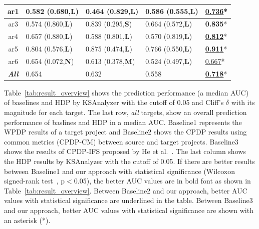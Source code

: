 \begin{table}[!t]
\begin{tabular}{|@{}c@{}||@{}C{21mm}@{}|@{}C{21mm}@{}|@{}C{21mm}@{}||@{}C{8mm}@{}|}
ar1	&0.582 (0.680,{\bf L})	&0.464 (0.829,{\bf L})	&0.586 (0.555,{\bf L})	&\underline{{\bf 0.736}}* \\ \hline
ar3	&0.574 (0.860,{\bf L})	&0.839 (0.295,{\bf S})	&0.664 (0.572,{\bf L})	&{\bf 0.835}* \\ \hline
ar4	&0.657 (0.880,{\bf L})	&0.588 (0.801,{\bf L})	&0.570 (0.819,{\bf L})	&\underline{{\bf 0.812}}* \\ \hline
ar5	&0.804 (0.576,{\bf L})	&0.875 (0.474,{\bf L})	&0.766 (0.550,{\bf L})	&\underline{{\bf 0.911}}* \\ \hline
ar6	&0.654 (0.072,{\bf N})	&0.613 (0.378,{\bf M})	&0.524 (0.497,{\bf L})	&\underline{0.667}* \\ \hline
\hline
{\bf {\em All}}	&0.654		&0.632		&0.558		&\underline{{\bf 0.718}}*
\\ \hline



\end{tabular}
\end{table}

% 


Table~\ref{tab:result_overview} shows the prediction performance (a median AUC)
of baselines and HDP by KSAnalyzer with the cutoff of 0.05 and Cliff's $\delta$ with its magnitude
for each target. The last row, {\em all} targets, show an overall prediction performance of baslines and HDP in a median AUC. Baseline1 represents
the WPDP results of a target project and Baseline2 shows
the CPDP results using common metrics (CPDP-CM) between source and target
projects. Baseline3 shows the results of CPDP-IFS proposed by He et
al.~\cite{He14}. The last column shows the HDP results by KSAnalyzer with the
cutoff of 0.05. If there are better results between Baseline1 and our approach with statistical significance (Wilcoxon signed-rank
test~\cite{Wilcoxon45}, p$<$0.05), the better AUC values are in
bold font as shown in Table~\ref{tab:result_overview}.
Between Baseline2 and our approach, better AUC values with
statistical significance are underlined in
the table. Between Baseline3 and our approach, better AUC values with
statistical significance are shown with an asterisk (*).

